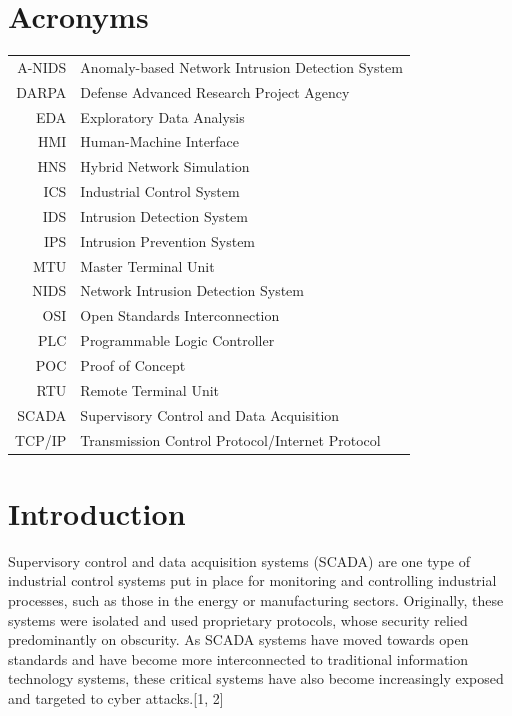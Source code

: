 \documentclass[11pt,]{article}
\begin{document}
\clearpage

\tableofcontents

\cleardoublepage

\listoffigures

\cleardoublepage

\listoftables

\newpage

\section*{Acronyms}\label{acronyms}

\begin{longtable}[c]{@{}rl@{}}
\toprule
A-NIDS & Anomaly-based Network Intrusion Detection System\tabularnewline
DARPA & Defense Advanced Research Project Agency\tabularnewline
EDA & Exploratory Data Analysis\tabularnewline
HMI & Human-Machine Interface\tabularnewline
HNS & Hybrid Network Simulation\tabularnewline
ICS & Industrial Control System\tabularnewline
IDS & Intrusion Detection System\tabularnewline
IPS & Intrusion Prevention System\tabularnewline
MTU & Master Terminal Unit\tabularnewline
NIDS & Network Intrusion Detection System\tabularnewline
OSI & Open Standards Interconnection\tabularnewline
PLC & Programmable Logic Controller\tabularnewline
POC & Proof of Concept\tabularnewline
RTU & Remote Terminal Unit\tabularnewline
SCADA & Supervisory Control and Data Acquisition\tabularnewline
TCP/IP & Transmission Control Protocol/Internet Protocol\tabularnewline
\bottomrule
\end{longtable}

\newpage
\mbox{} \thispagestyle{empty}

\clearpage
{}

\setcounter{page}{17}

\section{Introduction}\label{introduction}

Supervisory control and data acquisition systems (SCADA) are one type of
industrial control systems put in place for monitoring and controlling
industrial processes, such as those in the energy or manufacturing
sectors. Originally, these systems were isolated and used proprietary
protocols, whose security relied predominantly on obscurity. As SCADA
systems have moved towards open standards and have become more
interconnected to traditional information technology systems, these
critical systems have also become increasingly exposed and targeted to
cyber attacks.{[}1, 2{]}
\end{document}

